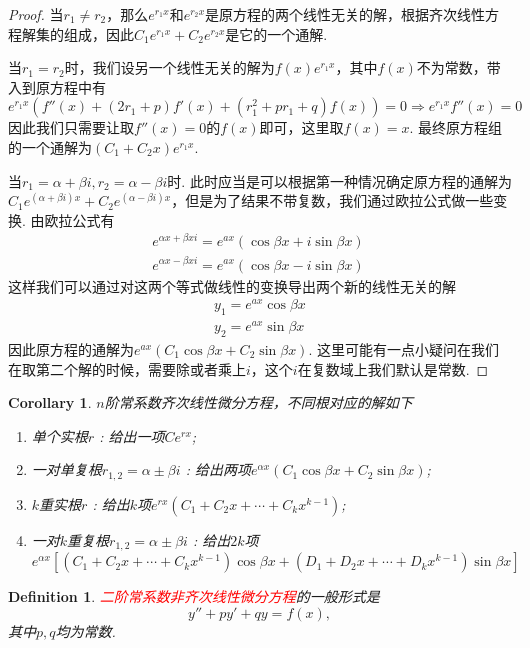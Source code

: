 \documentclass{article}
\newtheorem{corollary}[theorem]{Corollary}
\newtheorem{definition}[theorem]{Definition}
\newcommand{\redt}[1]{\textcolor{red}{#1}}
\begin{document}
\begin{proof}
\rm 当$r_1 \neq r_2$，那么$e^{r_1x}$和$e^{r_2x}$是原方程的两个线性无关的解，根据齐次线性方程解集的组成，因此$C_1e^{r_1x}+C_2e^{r_2x}$是它的一个通解. 

当$r_1 = r_2$时，我们设另一个线性无关的解为$f(x)e^{r_1x}$，其中$f(x)$不为常数，带入到原方程中有
$$
e^{r_1x}(f''(x) + (2r_1+p)f'(x) + (r_1^2 + pr_1 + q)f(x)) = 0 \Rightarrow e^{r_1x}f''(x) = 0
$$
因此我们只需要让取$f''(x) = 0$的$f(x)$即可，这里取$f(x)=x$. 最终原方程组的一个通解为$(C_1 +C_2x)e^{r_1x}$. 

当$r_1 = \alpha+\beta i, r_2 = \alpha - \beta i$时. 此时应当是可以根据第一种情况确定原方程的通解为$C_1e^{(\alpha+\beta i)x} + C_2e^{(\alpha - \beta i)x}$，但是为了结果不带复数，我们通过欧拉公式做一些变换. 由欧拉公式有
$$
\begin{array}{ll}
e^{\alpha x+\beta xi} = e^{ax}(\cos \beta x + i\sin \beta x)\\
e^{\alpha x-\beta xi} = e^{ax}(\cos \beta x - i\sin \beta x)\
\end{array}
$$
这样我们可以通过对这两个等式做线性的变换导出两个新的线性无关的解
$$
\begin{array}{ll}
y_1 = e^{ax}\cos \beta x \\
y_2 = e^{ax}\sin \beta x
\end{array}
$$
因此原方程的通解为$e^{ax}(C_1\cos \beta x +C_2 \sin \beta x)$. 这里可能有一点小疑问在我们在取第二个解的时候，需要除或者乘上$i$，这个$i$在复数域上我们默认是常数. 
\end{proof}

\begin{corollary}
\rm $n$阶常系数齐次线性微分方程，不同根对应的解如下
\begin{enumerate}
	\item 单个实根$r$ : 给出一项$Ce^{rx}$;
	\item 一对单复根$r_{1,2} = \alpha \pm \beta i$ : 给出两项$e^{\alpha x}(C_1\cos \beta x + C_2\sin \beta x)$;
	\item $k$重实根$r$ : 给出$k$项$e^{rx}(C_1 + C_2x + \cdots + C_kx^{k-1})$;
	\item 一对$k$重复根$r_{1,2} = \alpha \pm \beta i$ : 给出$2k$项$e^{\alpha x}[(C_1+C_2x +\cdots +C_kx^{k-1})\cos \beta x + (D_1+D_2x +\cdots +D_kx^{k-1})\sin \beta x]$
\end{enumerate}
\end{corollary}

\begin{definition}
\rm \redt{二阶常系数非齐次线性微分方程}的一般形式是
$$
y''+py' +qy = f(x),
$$
其中$p,q$均为常数. 
\end{definition}
\end{document}
